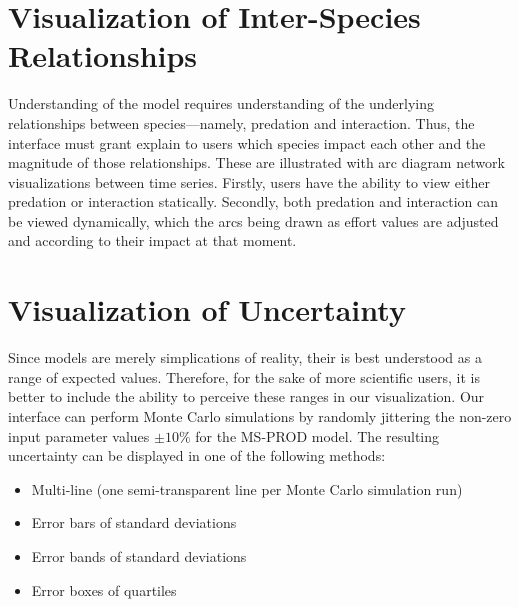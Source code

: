 \section{Visualization of Inter-Species Relationships}

Understanding of the model requires understanding of the underlying relationships between species---namely, predation and interaction.  Thus, the interface must grant explain to users which species impact each other and the magnitude of those relationships.  These are illustrated with arc diagram network visualizations between time series.  Firstly, users have the ability to view either predation or interaction statically.  Secondly, both predation and interaction can be viewed dynamically, which the arcs being drawn as effort values are adjusted and according to their impact at that moment.


\section{Visualization of Uncertainty}

Since models are merely simplications of reality, their is best understood as a range of expected values.  Therefore, for the sake of more scientific users, it is better to include the ability to perceive these ranges in our visualization.  Our interface can perform Monte Carlo simulations by randomly jittering the non-zero input parameter values $\pm 10\%$ for the MS-PROD model.  The resulting uncertainty can be displayed in one of the following methods:

 \begin{itemize}
   \item Multi-line (one semi-transparent line per Monte Carlo simulation run)
   \item Error bars of standard deviations
   \item Error bands of standard deviations
   \item Error boxes of quartiles
 \end{itemize}



